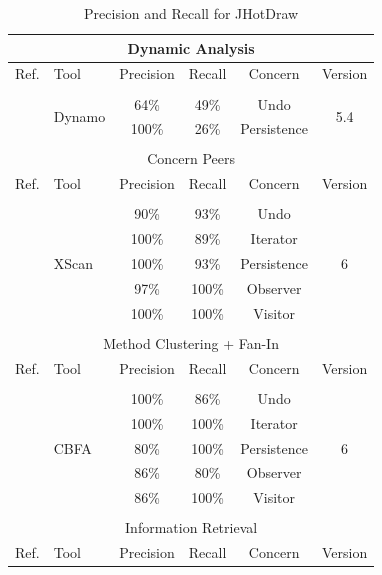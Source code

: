 \begin{table}[!t]\tiny
\centering
\caption{Precision and Recall for JHotDraw}
\begin{threeparttable}

\begin{tabular}{|c|l|c|c|c|c|}


\hline \multicolumn{6}{|c|}{Dynamic Analysis} \\ 
\hline {Ref.} & {Tool} &  {Precision} & {Recall} & {Concern} & {Version} \\
\cline{1-6}
\hline
&  &  &  &  &  \\
\multirow{2}{*}{\cite{Ceccato2009}}&\multirow{2}{*}{Dynamo}	&64\%           & 49\%     	  		&  	Undo	&\multirow{2}{*}{5.4}	\\
						& &100\%        & 26\%          	  & Persistence		&  		\\
&  &  &  &  &  \\						
\cline{1-6}
\hline \multicolumn{6}{|c|}{Concern Peers} \\ 
\hline {Ref.} & {Tool} &  {Precision} & {Recall} & {Concern} & {Version} \\
\cline{1-6}
&  &  &  &  &  \\
\multirow{5}{*}{\cite{Nguyen2011}}&\multirow{5}{*}{XScan}&90\%&93\%&Undo&\multirow{5}{*}{6} \\
&&100\%&89\%&Iterator & \\
&&100\%&93\%&Persistence & \\
&&97\%&100\%&Observer & \\
&&100\%&100\%&Visitor & \\
&  &  &  &  &  \\
\cline{1-6}
\hline \multicolumn{6}{|c|}{Method Clustering + Fan-In} \\ 
\hline {Ref.} & {Tool} &  {Precision} & {Recall} & {Concern} & {Version} \\
\cline{1-6}
&  &  &  &  &  \\
\multirow{5}{*}{\cite{Nguyen2011}}&\multirow{5}{*}{CBFA}&100\%&86\%&Undo&\multirow{5}{*}{6} \\
&&100\%&100\%&Iterator & \\
&&80\%&100\%&Persistence & \\
&&86\%&80\%&Observer & \\
&&86\%&100\%&Visitor & \\
&  &  &  &  &  \\
\cline{1-6}
\hline \multicolumn{6}{|c|}{Information Retrieval} \\ 
\hline {Ref.} & {Tool} &  {Precision} & {Recall} & {Concern} & {Version} \\

\end{tabular}
\end{threeparttable}
\end{table}
